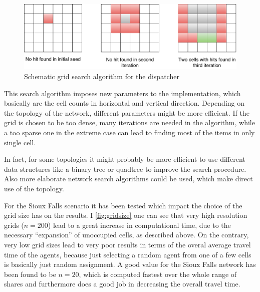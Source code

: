 \begin{figure}
    \centering
    \includegraphics[width=1.0\textwidth]{figures/gridsearch.pdf}
    \caption{Schematic grid search algorithm for the dispatcher}
    \label{fig:gridsearch}
\end{figure}

This search algorithm imposes new parameters to the implementation, which basically
are the cell counts in horizontal and vertical direction. Depending on the topology
of the network, different parameters might be more efficient. If the grid is chosen
to be too dense, many iterations are needed in the algorithm, while a too sparse one
in the extreme case can lead to finding most of the items in only single cell.

In fact, for some topologies it might probably be more efficient to use different
data structures like a binary tree or quadtree to improve the search procedure.
Also more elaborate network search algorithms could be used, which make direct use
of the topology. 


For the Sioux Falls scenario it has been tested which impact the choice of the grid
size has on the results. I \cref{fig:gridsize} one can see that very high resolution
grids ($n=200$) lead to a great increase in computational time, due to the necessary
``expansion'' of unoccupied cells, as described above. On the contrary, very low
grid sizes lead to very poor results in terms of the overal average travel time of
the agents, because just selecting a random agent from one of a few cells is basically
just random assignment. A good value for the Sioux Falls network has been found to
be $n=20$, which is computed fastest over the whole range of shares and furthermore
does a good job in decreasing the overall travel time.

